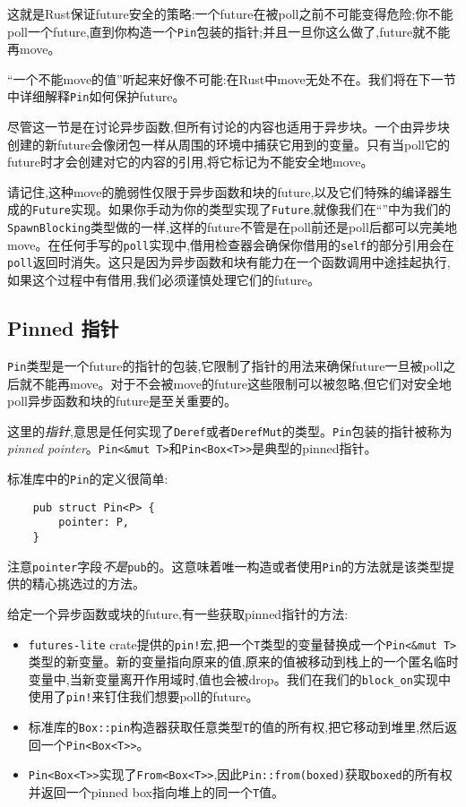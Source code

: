 这就是Rust保证future安全的策略:一个future在被poll之前不可能变得危险;你不能poll一个future,直到你构造一个\texttt{Pin}包装的指针;并且一旦你这么做了,future就不能再move。

“一个不能move的值”听起来好像不可能:在Rust中move无处不在。我们将在下一节中详细解释\texttt{Pin}如何保护future。

尽管这一节是在讨论异步函数,但所有讨论的内容也适用于异步块。一个由异步块创建的新future会像闭包一样从周围的环境中捕获它用到的变量。只有当poll它的future时才会创建对它的内容的引用,将它标记为不能安全地move。

请记住,这种move的脆弱性仅限于异步函数和块的future,以及它们特殊的编译器生成的\texttt{Future}实现。如果你手动为你的类型实现了\texttt{Future},就像我们在“”中为我们的\texttt{SpawnBlocking}类型做的一样,这样的future不管是在poll前还是poll后都可以完美地move。在任何手写的\texttt{poll}实现中,借用检查器会确保你借用的\texttt{self}的部分引用会在\texttt{poll}返回时消失。这只是因为异步函数和块有能力在一个函数调用中途挂起执行,如果这个过程中有借用,我们必须谨慎处理它们的future。

\subsection{Pinned 指针}
\texttt{Pin}类型是一个future的指针的包装,它限制了指针的用法来确保future一旦被poll之后就不能再move。对于不会被move的future这些限制可以被忽略,但它们对安全地poll异步函数和块的future是至关重要的。

这里的\emph{指针},意思是任何实现了\texttt{Deref}或者\texttt{DerefMut}的类型。\texttt{Pin}包装的指针被称为\emph{pinned pointer}。\texttt{Pin<\&mut T>}和\texttt{Pin<Box<T>>}是典型的pinned指针。

标准库中的\texttt{Pin}的定义很简单:
\begin{verbatim}
    pub struct Pin<P> {
        pointer: P,
    }
\end{verbatim}

注意\texttt{pointer}字段\emph{不是}\texttt{pub}的。这意味着唯一构造或者使用\texttt{Pin}的方法就是该类型提供的精心挑选过的方法。

给定一个异步函数或块的future,有一些获取pinned指针的方法:
\begin{itemize}
    \item \texttt{futures-lite} crate提供的\texttt{pin!}宏,把一个\texttt{T}类型的变量替换成一个\texttt{Pin<\&mut T>}类型的新变量。新的变量指向原来的值,原来的值被移动到栈上的一个匿名临时变量中,当新变量离开作用域时,值也会被drop。我们在我们的\texttt{block\_on}实现中使用了\texttt{pin!}来钉住我们想要poll的future。
    \item 标准库的\texttt{Box::pin}构造器获取任意类型\texttt{T}的值的所有权,把它移动到堆里,然后返回一个\texttt{Pin<Box<T>>}。
    \item \texttt{Pin<Box<T>>}实现了\texttt{From<Box<T>>},因此\texttt{Pin::from(boxed)}获取\texttt{boxed}的所有权并返回一个pinned box指向堆上的同一个\texttt{T}值。
\end{itemize}

